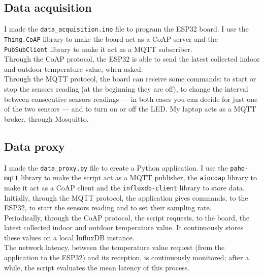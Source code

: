 \documentclass[conference]{IEEEtran}
\begin{document}
\subsection{Data acquisition}
I made the \texttt{data\_acquisition.ino} file to program the ESP32 board. I use the \texttt{Thing.CoAP} library to make the board act as a CoAP server and the \texttt{PubSubClient} library to make it act as a MQTT subscriber.\\
Through the CoAP protocol, the ESP32 is able to send the latest collected indoor and outdoor temperature value, when asked.\\
Through the MQTT protocol, the board can receive some commands: to start or stop the sensors reading (at the beginning they are off), to change the interval between consecutive sensors readings --- in both cases you can decide for just one of the two sensors --- and to turn on or off the LED. My laptop acts as a MQTT broker, through Mosquitto.

\subsection{Data proxy}
I made the \texttt{data\_proxy.py} file to create a Python application. I use the \texttt{paho-mqtt} library to make the script act as a MQTT publisher, the \texttt{aiocoap} library to make it act as a CoAP client and the \texttt{influxdb-client} library to store data.\\
Initially, through the MQTT protocol, the application gives commands, to the ESP32, to start the sensors reading and to set their sampling rate.\\
Periodically, through the CoAP protocol, the script requests, to the board, the latest collected indoor and outdoor temperature value. It continuously stores these values on a local InfluxDB instance.\\
The network latency, between the temperature value request (from the application to the ESP32) and its reception, is continuously monitored; after a while, the script evaluates the mean latency of this process.
\end{document}
